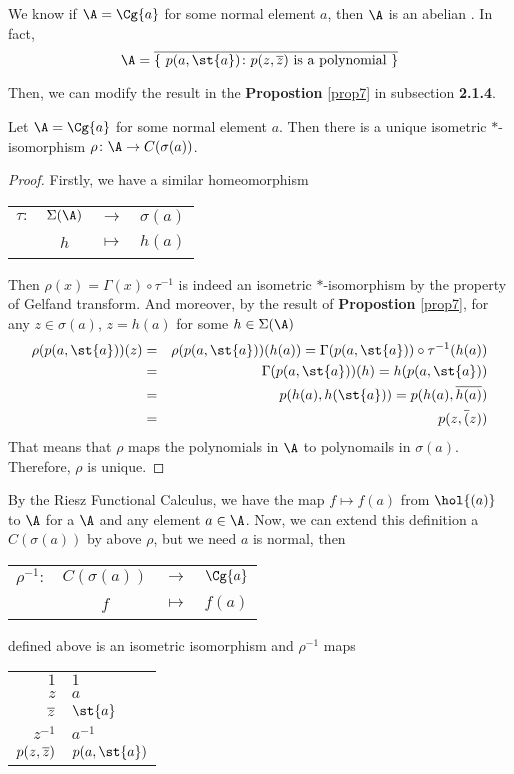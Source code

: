 We know if $\A = \Cg{a}$ for some normal element $a$, then $\A$ is an abelian \Cs. In fact, 
\begin{equation*}
	\A = \clo{\{~p(a,\st{a}) \colon p(z,\clo{z}) \text{ is a polynomial} ~\}}
\end{equation*}

Then, we can modify the result in the \textbf{Propostion} \ref{prop7} in subsection \textbf{2.1.4}.

\begin{thm}
	Let $\A = \Cg{a}$ for some normal element $a$. Then there is a unique isometric $*$-isomorphism $\rho \colon \A \sto C(\sigma(a))$.
\end{thm}
\begin{proof}
	Firstly, we have a similar homeomorphism
	\begin{center}
		\begin{tabular}{l c c l}
			$\tau \colon$ & $\Sigma(\A)$ & $\longrightarrow$ & $\sigma(a)$ \\
			~ & $h$ & $\longmapsto$ & $h(a)$
		\end{tabular}
	\end{center}
	Then $\rho(x) = \Gamma(x) \circ \tau^{-1}$ is indeed an isometric $*$-isomorphism by the property of Gelfand transform. And moreover, by the result of \textbf{Propostion} \ref{prop7}, for any $z \in \sigma(a)$, $z = h(a)$ for some $h \in \Sigma(\A)$
	\begin{eqnarray*}
		\rho(p(a,\st{a}))(z) &=& \rho(p(a,\st{a}))(h(a)) = \Gamma(p(a,\st{a})) \circ \tau^{-1} (h(a)) \\
		&=& \Gamma(p(a,\st{a}))(h) = h(p(a,\st{a})) \\
		&=& p(h(a), h(\st{a})) = p(h(a), \clo{h(a)}) \\
		&=& p(z,\clo(z))
	\end{eqnarray*}
	That means that $\rho$ maps the polynomials in $\A$ to polynomails in $\sigma(a)$. Therefore, $\rho$ is unique.
\end{proof}

By the Riesz Functional Calculus, we have the map $f \mapsto f(a)$ from $\hol{(a)}$ to $\A$ for a \Cs $\A$ and any element $a \in \A$. Now, we can extend this definition a $C(\sigma(a))$ by above $\rho$, but we need $a$ is normal, then
\begin{center}
	\begin{tabular}{l c c l}
		$\rho^{-1} \colon$ & $C(\sigma(a))$ & $\longrightarrow$ & $\Cg{a}$ \\
		~ & $f$ & $\longmapsto$ & $f(a)$
	\end{tabular}
\end{center}
defined above is an isometric isomorphism and $\rho^{-1}$ maps
\begin{center}
	\begin{tabular}{r @{$~\longmapsto$~} l}
		$1$ & $1$ \\
		$z$ & $a$ \\
		$\overline{z}$ & $\st{a}$ \\
		$z^{-1}$ & $a^{-1}$\\
		$p(z,\overline{z})$ & $p(a,\st{a})$ 
	\end{tabular}
\end{center}

